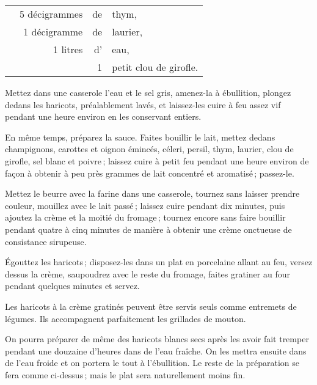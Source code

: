 \begin{longtable}{rrrrrp{18em}}
  & \multicolumn{3}{r}{5 décigrammes} & de & thym,                                                        \\
  & \multicolumn{3}{r}{1 décigramme}  & de & laurier,                                                     \\
  & \hspace{2em} &    & 1 litres & d' & eau,                                                              \\
  & \hspace{2em} &    &          &  1 & petit clou de girofle.                                            \\
\end{longtable}
\normalsize

Mettez dans une casserole l'eau et le sel gris, amenez-la à ébullition, plongez
dedans les haricots, préalablement lavés, et laissez-les cuire à feu assez vif
pendant une heure environ en les conservant entiers.

En même temps, préparez la sauce. Faites bouillir le lait, mettez dedans
champignons, carottes et oignon émincés, céleri, persil, thym, laurier, clou de
girofle, sel blanc et poivre ; laissez cuire à petit feu pendant une heure
environ de façon à obtenir à peu près {\mmm} grammes de lait concentré
et aromatisé ; passez-le.

Mettez le beurre avec la farine dans une casserole, tournez sans laisser
prendre couleur, mouillez avec le lait passé ; laissez cuire pendant dix
minutes, puis ajoutez la crème et la moitié du fromage ; tournez encore sans
faire bouillir pendant quatre à cinq minutes de manière à obtenir une crème
onctueuse de consistance sirupeuse.

Égouttez les haricots ; disposez-les dans un plat en porcelaine allant au feu,
versez dessus la crème, saupoudrez avec le reste du fromage, faites gratiner au
four pendant quelques minutes et servez.

\medskip

Les haricots à la crème gratinés peuvent être servis seuls comme entremets de
légumes. Ils accompagnent parfaitement les grillades de mouton.

\sk

On pourra préparer de même des haricots blancs secs après les avoir fait
tremper pendant une douzaine d'heures dans de l’eau fraîche. On les mettra
ensuite dans de l'eau froide et on portera le tout à l'ébullition. Le reste de
la préparation se fera comme ci-dessus ; mais le plat sera naturellement moins
fin.

